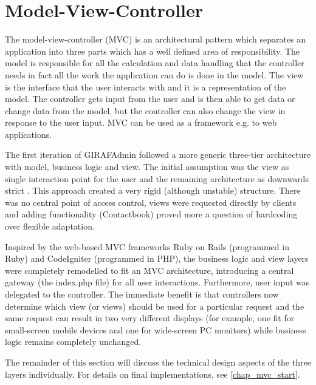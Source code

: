 \section{Model-View-Controller}
The model-view-controller (MVC) is an architectural pattern which separates an application into three parts which has a well defined area of responsibility. The model is responsible for all the calculation and data handling that the controller needs in fact all the work the application can do is done in the model. The view is the interface that the user interacts with and it is a representation of the model. The controller gets input from the user and is then able to get data or change data from the model, but the controller can also change the view in response to the user input\cite{vmc}. MVC can be used as a framework e.g. to web applications.

The first iteration of GIRAFAdmin followed a more generic three-tier architecture with model, business logic and view. The initial assumption was the view as single interaction point for the user and the remaining architecture as downwards strict . This approach created a very rigid (although unstable) structure. There was no central point of access control, views were requested directly by clients and adding functionality (Contactbook) proved more a question of hardcoding over flexible adaptation.

Inspired by the web-based MVC frameworks Ruby on Rails (programmed in Ruby) and CodeIgniter (programmed in PHP), the business logic and view layers were completely remodelled to fit an MVC architecture, introducing a central gateway (the index.php file) for all user interactions. Furthermore, user input was delegated to the controller. The immediate benefit is that controllers now determine which view (or views) should be used for a particular request and the same request can result in two very different displays (for example, one fit for small-screen mobile devices and one for wide-screen PC monitors) while business logic remains completely unchanged.

The remainder of this section will discuss the technical design aspects of the three layers individually. For details on final implementations, see \vref{chap_mvc_start}.


